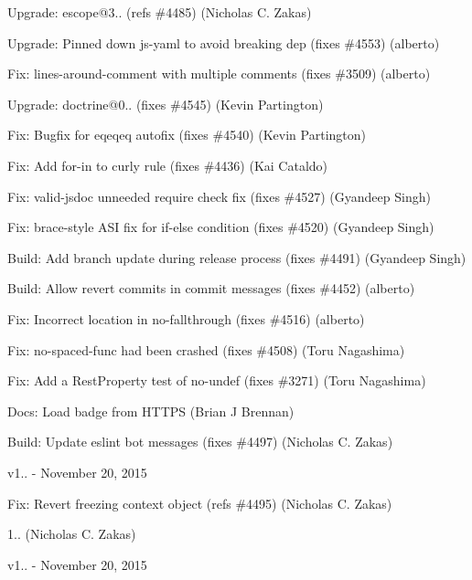 \begin{DoxyItemize}
\item Upgrade\+: escope@3.. (refs \#4485) (Nicholas C. Zakas)
\item Upgrade\+: Pinned down js-\/yaml to avoid breaking dep (fixes \#4553) (alberto)
\item Fix\+: lines-\/around-\/comment with multiple comments (fixes \#3509) (alberto)
\item Upgrade\+: doctrine@0.. (fixes \#4545) (Kevin Partington)
\item Fix\+: Bugfix for eqeqeq autofix (fixes \#4540) (Kevin Partington)
\item Fix\+: Add for-\/in to {\ttfamily curly} rule (fixes \#4436) (Kai Cataldo)
\item Fix\+: {\ttfamily valid-\/jsdoc} unneeded require check fix (fixes \#4527) (Gyandeep Singh)
\item Fix\+: {\ttfamily brace-\/style} A\+SI fix for if-\/else condition (fixes \#4520) (Gyandeep Singh)
\item Build\+: Add branch update during release process (fixes \#4491) (Gyandeep Singh)
\item Build\+: Allow revert commits in commit messages (fixes \#4452) (alberto)
\item Fix\+: Incorrect location in no-\/fallthrough (fixes \#4516) (alberto)
\item Fix\+: {\ttfamily no-\/spaced-\/func} had been crashed (fixes \#4508) (Toru Nagashima)
\item Fix\+: Add a Rest\+Property test of {\ttfamily no-\/undef} (fixes \#3271) (Toru Nagashima)
\item Docs\+: Load badge from H\+T\+T\+PS (Brian J Brennan)
\item Build\+: Update eslint bot messages (fixes \#4497) (Nicholas C. Zakas)
\end{DoxyItemize}

v1.. -\/ November 20, 2015


\begin{DoxyItemize}
\item Fix\+: Revert freezing context object (refs \#4495) (Nicholas C. Zakas)
\item 1.. (Nicholas C. Zakas)
\end{DoxyItemize}

v1.. -\/ November 20, 2015


